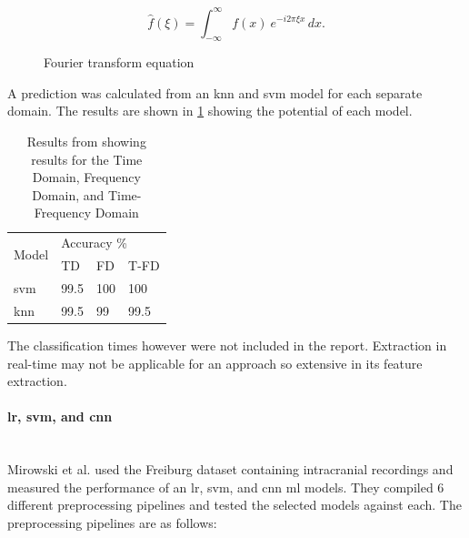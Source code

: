 \documentclass[12pt]{article}
\begin{document}
\begin{figure}[H]
\[ \widehat{f}(\xi) = \int_{-\infty}^{\infty} f(x)\ e^{-i 2\pi \xi x}\,dx. \]
\caption{Fourier transform equation}
\label{eq:fourier}
\end{figure}

A prediction was calculated from an \acrshort{knn} and \acrshort{svm} model for each separate domain. The results are shown in \ref{tab:svm_knn} showing the potential of each model.

\begin{table}[H]
\centering
\begin{tabular}{llll}
\multirow{2}{*}{Model}         & \multicolumn{3}{l}{Accuracy \%} \\
                               & TD & FD & T-FD\\
\protect\acrfull{svm} & 99.5        & 100              & 100                   \\
\protect\acrfull{knn} & 99.5        & 99               & 99.5                 
\end{tabular}
\caption{Results from \protect\cite{savadkoohi2020machine} showing results for the Time Domain, Frequency Domain, and Time-Frequency Domain}
\label{tab:svm_knn}
\end{table}

The classification times however were not included in the report. Extraction in real-time may not be applicable for an approach so extensive in its feature extraction. 

\paragraph{\acrfull{lr}, \acrfull{svm}, and \acrfull{cnn}}\mbox{}\\

Mirowski et al. used the Freiburg dataset \cite{freiburg_eeg} containing intracranial recordings and measured the performance of an \acrshort{lr}, \acrshort{svm}, and \acrshort{cnn} \acrshort{ml} models. They compiled 6 different preprocessing pipelines and tested the selected models against each. The preprocessing pipelines are as follows: 
\end{document}
